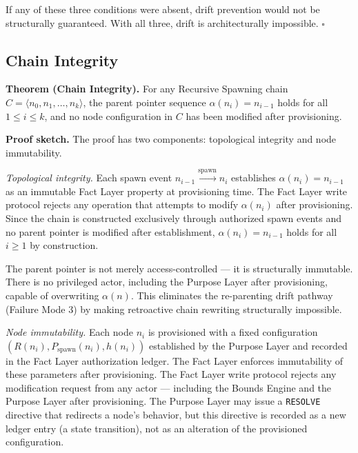 If any of these three conditions were absent, drift prevention would not be structurally guaranteed. With all three, drift is architecturally impossible. $\square$

\subsection{Chain Integrity}
\label{sec:rs-chain-integrity}

\medskip
\noindent\textbf{Theorem (Chain Integrity).} For any Recursive Spawning chain $C = \langle n_0, n_1, \ldots, n_k \rangle$, the parent pointer sequence $\alpha(n_i) = n_{i-1}$ holds for all $1 \leq i \leq k$, and no node configuration in $C$ has been modified after provisioning.

\medskip
\noindent\textbf{Proof sketch.} The proof has two components: topological integrity and node immutability.

\medskip
\textit{Topological integrity.} Each spawn event $n_{i-1} \xrightarrow{\text{spawn}} n_i$ establishes $\alpha(n_i) = n_{i-1}$ as an immutable Fact Layer property at provisioning time. The Fact Layer write protocol rejects any operation that attempts to modify $\alpha(n_i)$ after provisioning. Since the chain is constructed exclusively through authorized spawn events and no parent pointer is modified after establishment, $\alpha(n_i) = n_{i-1}$ holds for all $i \geq 1$ by construction.

The parent pointer is not merely access-controlled --- it is structurally immutable. There is no privileged actor, including the Purpose Layer after provisioning, capable of overwriting $\alpha(n)$. This eliminates the re-parenting drift pathway (Failure Mode 3) by making retroactive chain rewriting structurally impossible.

\medskip
\textit{Node immutability.} Each node $n_i$ is provisioned with a fixed configuration $(R(n_i), P_{\text{spawn}}(n_i), h(n_i))$ established by the Purpose Layer and recorded in the Fact Layer authorization ledger. The Fact Layer enforces immutability of these parameters after provisioning. The Fact Layer write protocol rejects any modification request from any actor --- including the Bounds Engine and the Purpose Layer after provisioning. The Purpose Layer may issue a \texttt{RESOLVE} directive that redirects a node's behavior, but this directive is recorded as a new ledger entry (a state transition), not as an alteration of the provisioned configuration.

